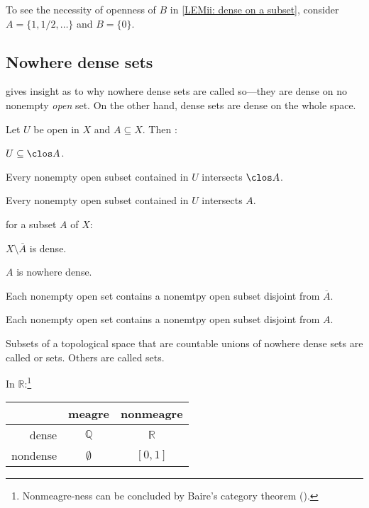 	\begin{rmk}
		To see the necessity of openness of $B$ in \ref{LEMii: dense on a subset}, consider $A = \{1, 1/2, \ldots\}$ and $B = \{0\}$.
	\end{rmk}
	
	
	
\subsection{Nowhere dense sets}
	
	 gives insight as to why nowhere dense sets are called so---they are dense on no nonempty \emph{open} set. On the other hand, dense sets are dense on the whole space.
	
	\begin{lem}
		Let $U$ be open in $X$ and $A\subseteq X$. Then \tfae:
		\begin{mylist}
			\item $U\subseteq \clos A$.
			
			\item Every nonempty open subset contained in $U$ intersects $\clos A$.
			
			\item Every nonempty open subset contained in $U$ intersects $A$.
		\end{mylist}
	\end{lem}
	
	\begin{cor}\label{COR: characterizing nowhere dense}
		\Tfae for a subset $A$ of $X$:
		\begin{mylist}
			\item $X\setminus \overline A$ is dense.
			
			\item $A$ is nowhere dense.
			
			\item Each nonempty open set contains a nonemtpy open subset disjoint from $\overline A$.
			
			\item Each nonempty open set contains a nonemtpy open subset disjoint from $A$.
		\end{mylist}
	\end{cor}
	
	Subsets of a topological space that are countable unions of nowhere dense sets are called  or  sets. Others are called  sets.
	
	\begin{rmk}
		In $\mathbb R$:\footnote{Nonmeagre-ness can be concluded by Baire's category theorem ().}
		\begin{center}
			\begin{tabular}{r|cc}
				& meagre & nonmeagre\\
				\hline
				dense & $\mathbb Q$ & $\mathbb R$\\
				nondense & $\emptyset$ & $[0, 1]$
			\end{tabular}
		\end{center}
	\end{rmk}
	
